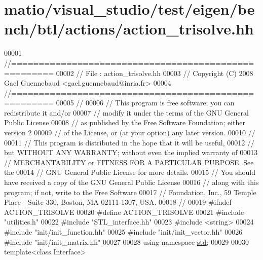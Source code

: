 \hypertarget{matio_2visual__studio_2test_2eigen_2bench_2btl_2actions_2action__trisolve_8hh_source}{}\section{matio/visual\+\_\+studio/test/eigen/bench/btl/actions/action\+\_\+trisolve.hh}
\label{matio_2visual__studio_2test_2eigen_2bench_2btl_2actions_2action__trisolve_8hh_source}

\begin{DoxyCode}
00001 \textcolor{comment}{//=====================================================}
00002 \textcolor{comment}{// File   :  action\_trisolve.hh}
00003 \textcolor{comment}{// Copyright (C) 2008 Gael Guennebaud <gael.guennebaud@inria.fr>}
00004 \textcolor{comment}{//=====================================================}
00005 \textcolor{comment}{//}
00006 \textcolor{comment}{// This program is free software; you can redistribute it and/or}
00007 \textcolor{comment}{// modify it under the terms of the GNU General Public License}
00008 \textcolor{comment}{// as published by the Free Software Foundation; either version 2}
00009 \textcolor{comment}{// of the License, or (at your option) any later version.}
00010 \textcolor{comment}{//}
00011 \textcolor{comment}{// This program is distributed in the hope that it will be useful,}
00012 \textcolor{comment}{// but WITHOUT ANY WARRANTY; without even the implied warranty of}
00013 \textcolor{comment}{// MERCHANTABILITY or FITNESS FOR A PARTICULAR PURPOSE.  See the}
00014 \textcolor{comment}{// GNU General Public License for more details.}
00015 \textcolor{comment}{// You should have received a copy of the GNU General Public License}
00016 \textcolor{comment}{// along with this program; if not, write to the Free Software}
00017 \textcolor{comment}{// Foundation, Inc., 59 Temple Place - Suite 330, Boston, MA  02111-1307, USA.}
00018 \textcolor{comment}{//}
00019 \textcolor{preprocessor}{#ifndef ACTION\_TRISOLVE}
00020 \textcolor{preprocessor}{#define ACTION\_TRISOLVE}
00021 \textcolor{preprocessor}{#include "utilities.h"}
00022 \textcolor{preprocessor}{#include "STL\_interface.hh"}
00023 \textcolor{preprocessor}{#include <string>}
00024 \textcolor{preprocessor}{#include "init/init\_function.hh"}
00025 \textcolor{preprocessor}{#include "init/init\_vector.hh"}
00026 \textcolor{preprocessor}{#include "init/init\_matrix.hh"}
00027 
00028 \textcolor{keyword}{using namespace }\hyperlink{namespacestd}{std};
00029 
00030 \textcolor{keyword}{template}<\textcolor{keyword}{class} Interface>

\end{DoxyCode}
